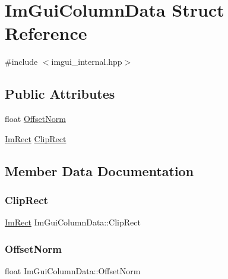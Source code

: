\hypertarget{struct_im_gui_column_data}{}\section{Im\+Gui\+Column\+Data Struct Reference}
\label{struct_im_gui_column_data}


{\ttfamily \#include $<$imgui\+\_\+internal.\+hpp$>$}

\subsection*{Public Attributes}
\begin{DoxyCompactItemize}
\item 
float \hyperlink{struct_im_gui_column_data_a9678a00f55c9fa44ed35ec14ea9b697b}{Offset\+Norm}
\item 
\hyperlink{struct_im_rect}{Im\+Rect} \hyperlink{struct_im_gui_column_data_aeccf8bbbd380fdd9d3350b5aac95ad34}{Clip\+Rect}
\end{DoxyCompactItemize}


\subsection{Member Data Documentation}
\hypertarget{struct_im_gui_column_data_aeccf8bbbd380fdd9d3350b5aac95ad34}{}\label{struct_im_gui_column_data_aeccf8bbbd380fdd9d3350b5aac95ad34} 
\subsubsection{\texorpdfstring{Clip\+Rect}{ClipRect}}
{\footnotesize\ttfamily \hyperlink{struct_im_rect}{Im\+Rect} Im\+Gui\+Column\+Data\+::\+Clip\+Rect}

\hypertarget{struct_im_gui_column_data_a9678a00f55c9fa44ed35ec14ea9b697b}{}\label{struct_im_gui_column_data_a9678a00f55c9fa44ed35ec14ea9b697b} 
\subsubsection{\texorpdfstring{Offset\+Norm}{OffsetNorm}}
{\footnotesize\ttfamily float Im\+Gui\+Column\+Data\+::\+Offset\+Norm}

